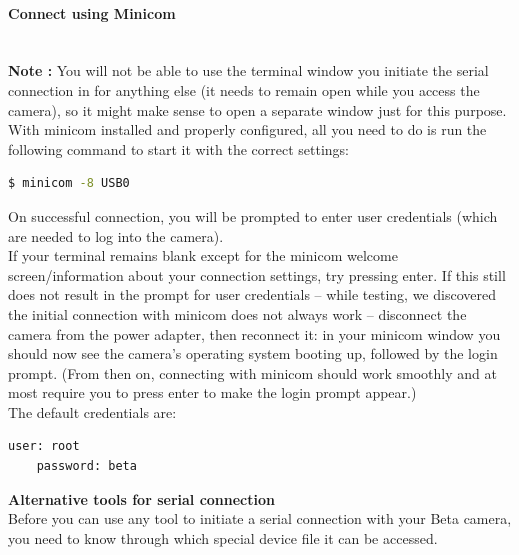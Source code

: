 \paragraph{Connect using Minicom}\mbox{}\\

\textbf{Note :} You will not be able to use the terminal window you initiate the serial connection in for anything else (it needs to remain open while you access the camera), so it might make sense to open a separate window just for this purpose.\\

With minicom installed and properly configured, all you need to do is run the following command to start it with the correct settings:

\begin{lstlisting}[language=bash,morekeywords=$,keywordstyle=\bfseries,frame=none,xleftmargin=.25in,belowskip=2em, aboveskip=2em]
$ minicom -8 USB0
\end{lstlisting}

On successful connection, you will be prompted to enter user credentials (which are needed to log into the camera).\\

If your terminal remains blank except for the minicom welcome screen/information about your connection settings, try pressing enter. If this still does not result in the prompt for user credentials – while testing, we discovered the initial connection with minicom does not always work – disconnect the camera from the power adapter, then reconnect it: in your minicom window you should now see the camera's operating system booting up, followed by the login prompt. (From then on, connecting with minicom should work smoothly and at most require you to press enter to make the login prompt appear.)\\

The default credentials are: 

\begin{lstlisting}[language=bash,morekeywords=$,keywordstyle=\bfseries,frame=none,xleftmargin=.25in,belowskip=2em, aboveskip=2em]
    user: root
    password: beta
\end{lstlisting}

\textbf{Alternative tools for serial connection}\\

Before you can use any tool to initiate a serial connection with your Beta camera, you need to know through which special device file it can be accessed.\\

